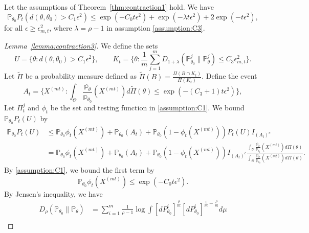 \documentclass[10pt,a4paper]{amsart}
\newcommand\bP{\mathbb{P}}
\newcommand\bp{\mathbb{p}}
\begin{document}
\begin{lemma}\label{lemma:contraction3}
   Let the assumptions of Theorem~\ref{thm:contraction1} hold. We have
   \begin{equation*}
    \bP_{\theta_0} P_t(d(\theta, \theta_0) > C_1 \epsilon^2) \leq  \exp(-C_0 t \epsilon^2) + \exp(-\lambda t \epsilon^2) + 2 \exp(-t \epsilon^2), 
   \end{equation*}
   for all $\epsilon \geq \epsilon_{m,t}^2$, where $\lambda = \rho -1$ in assumption \eqref{assumption:C3}. 
\end{lemma}

\begin{proof}[Lemma~\ref{lemma:contraction3}]
    We define the sets
\begin{equation*}
    U = \{\theta: d(\theta, \theta_0)  > C_1 \epsilon^2\}, \qquad K_t = \{\theta: \frac{1}{m}\sum_{j = 1}^m D_{1 + \lambda}(\bP_{\theta_0}^j \parallel \bP_\theta^j) \leq C_3 \epsilon_{m,t}^2\}. 
\end{equation*}
Let $\tilde \Pi$ be a probability measure defined as $\tilde \Pi(B) = \frac{\Pi(B \cap K_t)}{\Pi(K_t)}$.  Define the event
\begin{equation*}
    A_t = \{X^{(mt)}: \int_\Theta \frac{\bp_\theta}{\bp_{\theta_0}}(X^{(mt)}) d \tilde \Pi(\theta) \leq \exp(-(C_3 + 1) t \epsilon^2)\}, 
\end{equation*}
Let $\Pi_t^j$ and $\phi_t$ be the set and testing function in \eqref{assumption:C1}. We bound $\bP_{\theta_0}  P_t (U)$ by 
\begin{align*}
     \bP_{\theta_0}  P_t (U)& \leq \bP_{\theta_0} \phi_t(X^{(mt)}) + \bP_{\theta_0}(A_t) + \bP_{\theta_0} (1 - \phi_t(X^{(mt)})) P_t(U) I_{(A_t)^c} \\
     &= \bP_{\theta_0} \phi_t(X^{(mt)}) 
     + \bP_{\theta_0}(A_t) 
     + \bP_{\theta_0} (1 - \phi_t(X^{(mt)})) I_{(A_t)^c} \frac{\int_{U} \frac{\bp_\theta}{\bp_{\theta_0}}(X^{(mt)}) d \Pi(\theta)}{\int_{\Theta} \frac{\bp_\theta}{\bp_{\theta_0}}(X^{(mt)}) d \Pi(\theta)}. 
\end{align*}
By \eqref{assumption:C1}, we bound the first term by
\begin{equation*}
    \bP_{\theta_0} \phi_t(X^{(mt)})  \leq \exp(-C_0 t \epsilon^2). 
\end{equation*}
By Jensen's inequality, we have
\begin{align*}
   D_\rho(\bP_{\theta_0} \parallel \bP_\theta) &= \sum_{i = 1}^m \frac{1}{\rho - 1} \log \int [dP_{\theta_0}^i]^{\frac{\rho}{m}} [dP_{\theta_0}^i]^{\frac{1}{m} - \frac{\rho}{m}} d \mu \\

\end{align*}
\end{proof}
\end{document}
